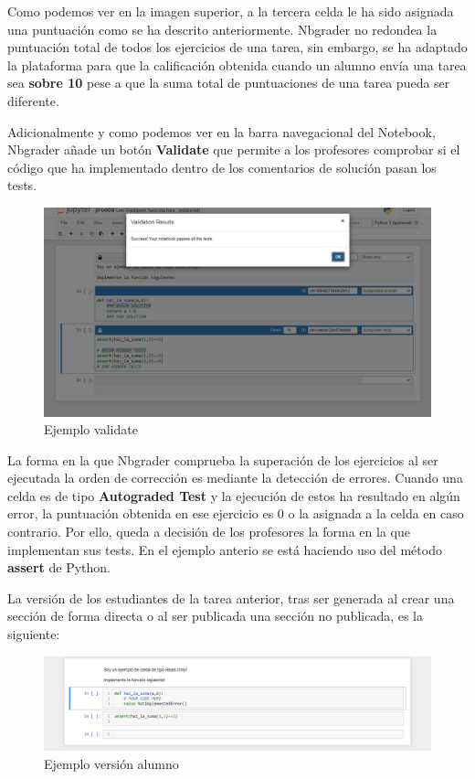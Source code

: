Como podemos ver en la imagen superior, a la tercera celda le ha sido asignada una puntuación como se ha descrito anteriormente.  Nbgrader no redondea la puntuación total de todos los ejercicios de una tarea, sin embargo, se ha adaptado la plataforma para que la calificación obtenida cuando un alumno envía una tarea sea \textbf{sobre 10} pese a que la suma total de puntuaciones de una tarea pueda ser diferente.

Adicionalmente y como podemos ver en la barra navegacional del Notebook, Nbgrader añade un botón \textbf{Validate} que permite a los profesores comprobar si el código que ha implementado dentro de los comentarios de solución pasan los tests.

\begin{figure}[H]
\centering
\includegraphics[width=\textwidth]{img/imgs-memoria/Succes!.PNG}
\caption{Ejemplo validate}
\end{figure}

La forma en la que Nbgrader comprueba la superación de los ejercicios al ser ejecutada la orden de corrección es mediante la detección de errores. Cuando una celda es de tipo \textbf{Autograded Test} y la ejecución de estos ha resultado en algún error, la puntuación obtenida en ese ejercicio es 0 o la asignada a la celda en caso contrario. Por ello, queda a decisión de los profesores la forma en la que implementan sus tests. En el ejemplo anterio se está haciendo uso del método \textbf{assert} de Python.

La versión de los estudiantes de la tarea anterior, tras ser generada al crear una sección de forma directa o al ser publicada una sección no publicada, es la siguiente:


\begin{figure}[H]
\centering
\includegraphics[width=\textwidth]{img/imgs-memoria/VAlumno.PNG}
\caption{Ejemplo versión alumno}
\end{figure}

